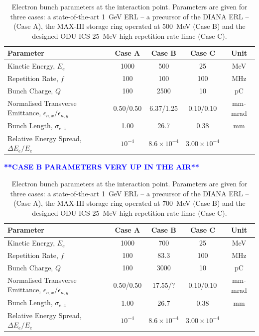 \documentclass[../main.tex]{subfiles}
\begin{document}
\begin{table}[!h]
\centering
\begin{tabular}{lcccc}
\hline\hline
Parameter & Case A & Case B & Case C & Unit \\
\hline
Kinetic Energy, $E_{e}$ & 1000 & 500 & 25 & \si{\mega\electronvolt} \\
Repetition Rate, $f$ & 100 & 100 & 100 & \si{\mega\hertz} \\
Bunch Charge, $Q$ & 100 & 2500 & 10 & \si{\pico\coulomb} \\
Normalised Transverse Emittance, $\epsilon_{n,x}/\epsilon_{n,y}$ & 0.50/0.50 & 6.37/1.25 & 0.10/0.10 & \si{\milli\meter}-\si{\milli\radian} \\
Bunch Length, $\sigma_{e,z}$ & 1.00 & 26.7 & 0.38 & \si{\milli\meter} \\
Relative Energy Spread, $\Delta E_{e}/E_{e}$ & $10^{-4}$ & $8.6\times 10^{-4}$ & $3.00\times 10^{-4}$ & \\
\hline\hline
\end{tabular}
\caption{Electron bunch parameters at the interaction point. Parameters are given for three cases: a state-of-the-art 1~\si{\giga\electronvolt} ERL -- a precursor of the DIANA ERL -- (Case A), the MAX-III storage ring operated at 500~\si{\mega\electronvolt} \cite{owen2013nonequilibrium} (Case B) and the designed ODU ICS 25~\si{\mega\electronvolt} high repetition rate linac \cite{krafft2016laser,deitrick2017inverse,deitrick2018high} (Case C).}
\label{tab:char_opt_electron_bunch_parameters}
\end{table}
\textcolor{blue}{\textbf{**CASE B PARAMETERS VERY UP IN THE AIR**}}
\begin{table}[!h]
\centering
\begin{tabular}{lcccc}
\hline\hline
Parameter & Case A & Case B & Case C & Unit \\
\hline
Kinetic Energy, $E_{e}$ & 1000 & 700 & 25 & \si{\mega\electronvolt} \\
Repetition Rate, $f$ & 100 & 83.3 & 100 & \si{\mega\hertz} \\
Bunch Charge, $Q$ & 100 & 3000 & 10 & \si{\pico\coulomb} \\
Normalised Transverse Emittance, $\epsilon_{n,x}/\epsilon_{n,y}$ & 0.50/0.50 & 17.55/? & 0.10/0.10 & \si{\milli\meter}-\si{\milli\radian} \\
Bunch Length, $\sigma_{e,z}$ & 1.00 & 26.7 & 0.38 & \si{\milli\meter} \\
Relative Energy Spread, $\Delta E_{e}/E_{e}$ & $10^{-4}$ & $8.6\times 10^{-4}$ & $3.00\times 10^{-4}$ & \\
\hline\hline
\end{tabular}
\caption{Electron bunch parameters at the interaction point. Parameters are given for three cases: a state-of-the-art 1~\si{\giga\electronvolt} ERL -- a precursor of the DIANA ERL -- (Case A), the MAX-III storage ring operated at 700~\si{\mega\electronvolt} \cite{owen2013nonequilibrium} (Case B) and the designed ODU ICS 25~\si{\mega\electronvolt} high repetition rate linac \cite{krafft2016laser,deitrick2017inverse,deitrick2018high} (Case C).}
\label{tab:char_opt_electron_bunch_parameters}
\end{table}
\end{document}
